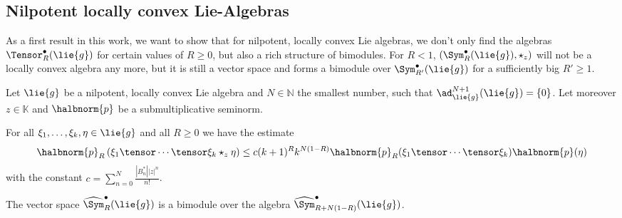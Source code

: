 \documentclass[
11pt,                          %
english                        %
]{article}
\begin{document}
\subsection{Nilpotent locally convex Lie-Algebras}
As a first result in this work, we want to show that for nilpotent, locally convex 
Lie algebras, we don't only find the algebras $\Tensor_R^{\bullet}(\lie{g})$ for 
certain values of $R \geq 0$, but also a rich structure of bimodules. For $R < 1$, 
$\left( \Sym_R^{\bullet}(\lie{g}), \star_z \right)$ will not be a locally convex 
algebra any more, but it is still a vector space and forms a bimodule over 
$\Sym_{R'}^{\bullet}(\lie{g})$ for a sufficiently big $R' \geq 1$.
\begin{proposition}
	\label{prop:bimodules}
	Let $\lie{g}$ be a nilpotent, locally convex Lie algebra and $N \in \mathbb{N}$ 
	the smallest number, such that $\ad_{\lie{g}}^{N+1}(\lie{g}) = \{ 0 \}$. Let 
	moreover $z \in \mathbb{K}$ and $\halbnorm{p}$ be a submultiplicative seminorm.
	\begin{propositionlist}
		\item
		For all $\xi_1, \ldots, \xi_k, \eta \in \lie{g}$ and all $R \geq 0$ we have 
		the estimate
		\begin{equation}
			\halbnorm{p}_R
			\left(
				\xi_1 \tensor \cdots \tensor \xi_k \star_z \eta
			\right)
			\leq
			c (k+1)^R k^{N(1-R)}
			\halbnorm{p}_R(\xi_1 \tensor \cdots \tensor \xi_k)
			\halbnorm{p}(\eta)
		\end{equation}
		with the constant $c = \sum_{n = 0}^N \frac{|B_n^*| |z|^n}{n!}$.
		
		\item
		The vector space $\widehat{\Sym}_R^{\bullet}(\lie{g})$ is a bimodule over 
		the algebra $\widehat{\Sym}_{R + N(1-R)}^{\bullet}(\lie{g})$.
	\end{propositionlist}
\end{proposition}
\end{document}
